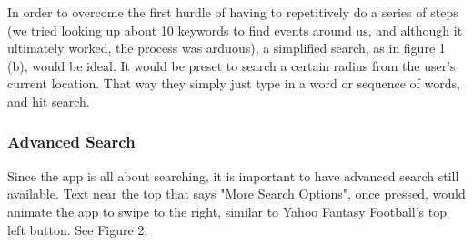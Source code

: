 \documentclass[11pt]{article}
\begin{document}
In order to overcome the first hurdle of having to repetitively do a series of steps (we tried looking up about 10 keywords to find events around us, and although it ultimately worked, the process was arduous), a simplified search, as in figure 1 (b), would be ideal. It would be preset to search a certain radius from the user's current location. That way they simply just type in a word or sequence of words, and hit search. 

\subsubsection{Advanced Search}
Since the app is all about searching, it is important to have advanced search still available. Text near the top that says "More Search Options", once pressed, would animate the app to swipe to the right, similar to Yahoo Fantasy Football's top left button. See Figure 2.
\end{document}

